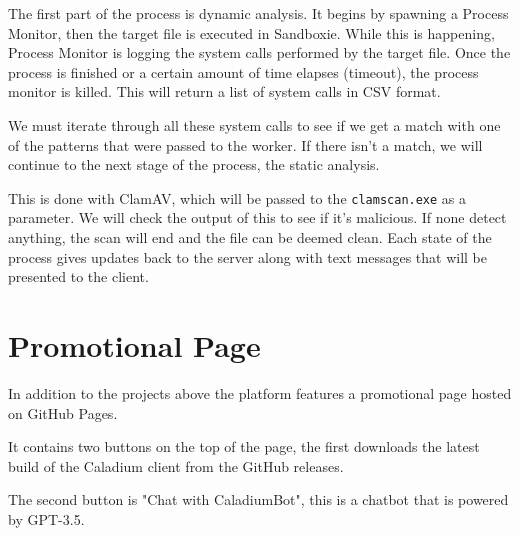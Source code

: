 The first part of the process is dynamic analysis.
It begins by spawning a Process Monitor,
then the target file is executed in Sandboxie.
While this is happening,
Process Monitor is logging the system calls performed by the target file.
Once the process is finished or a certain amount of time elapses (timeout),
the process monitor is killed. This will return a list of system calls in CSV format.

We must iterate through all these system calls to see if we
get a match with one of the patterns that were passed to the worker.
If there isn't a match, we will continue to the next stage of the process,
the static analysis.

This is done with ClamAV, which will be passed to the
\texttt{clamscan.exe} as a parameter.
We will check the output of this to see if it's malicious. If none detect anything,
the scan will end and the file can be deemed clean.
Each state of the process gives updates back to the server along with
text messages that will be presented to the client.

\section{Promotional Page}
In addition to the projects above the platform features a promotional page hosted on GitHub Pages.

It contains two buttons on the top of the page, the first downloads the latest build of the Caladium client from the GitHub releases.

The second button is "Chat with CaladiumBot", this is a chatbot that is powered by GPT-3.5.